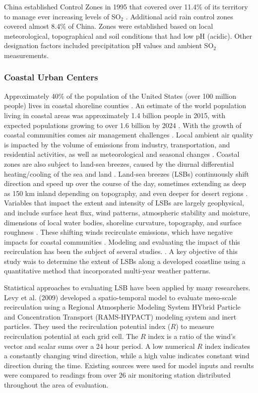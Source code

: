 China established Control Zones in 1995 that covered over 11.4\% of its territory to manage ever increasing levels of SO$_{2}$ \citep{Hao2000}.  Additional acid rain control zones covered almost 8.4\% of China.  Zones were established based on local meteorological, topographical and soil conditions that had low pH (acidic).  Other designation factors included precipitation pH values and ambient SO$_{2}$ measurements.

\subsubsection{Coastal Urban Centers}

Approximately 40\% of the population of the United States (over 100 million people) lives in coastal shoreline counties \citep{NOAA2013}.  An estimate of the world population living in coastal areas was approximately 1.4 billion people in 2015, with expected populations growing  to over 1.6 billion by 2024 \citep{Geohive2015}.  With the growth of coastal communities comes air management challenges \citep{Gamas2015}.  Local ambient air quality is impacted by the volume of emissions from industry, transportation, and residential activities, as well as meteorological and seasonal changes \citep{Fiore2015, Kimbrough2013}.  Coastal zones are also subject to land-sea breezes, caused by the diurnal differential heating/cooling of the sea and land \citep{Crosman2010, Cuxart2014, Tsai2011}.  Land-sea breezes (LSBs) continuously shift direction and speed up over the course of the day, sometimes extending as deep as 150 km inland depending on topography, and even deeper for desert regions \citep{Miao2015, Zhu2004}.  Variables that impact the extent and intensity of LSBs are largely geophysical, and include surface heat flux, wind patterns, atmospheric stability and moisture, dimensions of local water bodies, shoreline curvature, topography, and surface roughness \citep{Crosman2010, Lu1995}.  These shifting winds recirculate emissions, which have negative impacts for coastal communities \citep{Lu1996}.  Modeling and evaluating the impact of this recirculation has been the subject of several studies. \citep{Crosman2010, Levy2009, Wu2013, Zhu2004}.  A key objective of this study wais to determine the extent of LSBs along a developed coastline using a quantitative method that incorporated multi-year weather patterns. 

Statistical approaches to evaluating LSB have been applied by many researchers.  Levy et al. (2009) developed a spatio-temporal model to evaluate meso-scale recirculation using a Regional Atmospheric Modeling System HYbrid Particle and Concentration Transport (RAMS-HYPACT) modeling system and inert particles.  They used the recirculation potential index ($R$) to measure recirculation potential at each grid cell.  The $R$ index is a ratio of the wind’s vector and scalar sums over a 24 hour period.  A low numerical $R$ index indicates a constantly changing wind direction, while a high value indicates constant wind direction during the time.  Existing sources were used for model inputs and results were compared to readings from over 26 air monitoring station distributed throughout the area of evaluation.  

